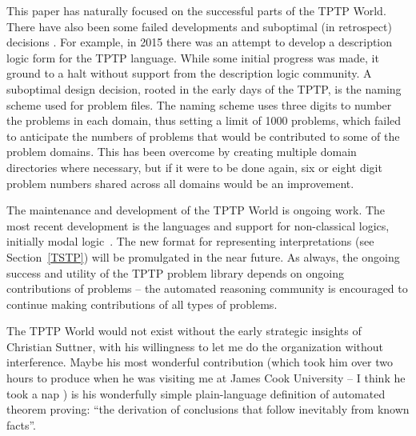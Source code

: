 \documentclass{easychair}
\begin{document}
This paper has naturally focused on the successful parts of the TPTP World.
There have also been some failed developments and suboptimal (in retrospect) decisions \frownie{}.
For example, in 2015 there was an attempt to develop a description logic form for the TPTP 
language. 
While some initial progress was made, it ground to a halt without support from the description 
logic community.
A suboptimal design decision, rooted in the early days of the TPTP, is the naming scheme used for 
problem files. 
The naming scheme uses three digits to number the problems in each domain, thus setting a limit 
of 1000 problems, which failed to anticipate the numbers of problems that would be contributed 
to some of the problem domains.
This has been overcome by creating multiple domain directories where necessary, but if it were 
to be done again, six or eight digit problem numbers shared across all domains would be an 
improvement.

The maintenance and development of the TPTP World is ongoing work.
The most recent development is the languages and support for non-classical logics, initially
modal logic~\cite{SF+22,SS24}.
The new format for representing interpretations (see Section~\ref{TSTP}) will be promulgated in 
the near future.
As always, the ongoing success and utility of the TPTP problem library depends on ongoing 
contributions of problems -- the automated reasoning community is encouraged to continue making 
contributions of all types of problems.

The TPTP World would not exist without the early strategic insights of Christian Suttner,
with his willingness to let me do the organization without interference. 
Maybe his most wonderful contribution (which took him over two hours to produce when he
was visiting me at James Cook University -- I think he took a nap \smiley) is his 
wonderfully simple plain-language definition of automated theorem proving: 
``the derivation of conclusions that follow inevitably from known facts''.



\end{document}
